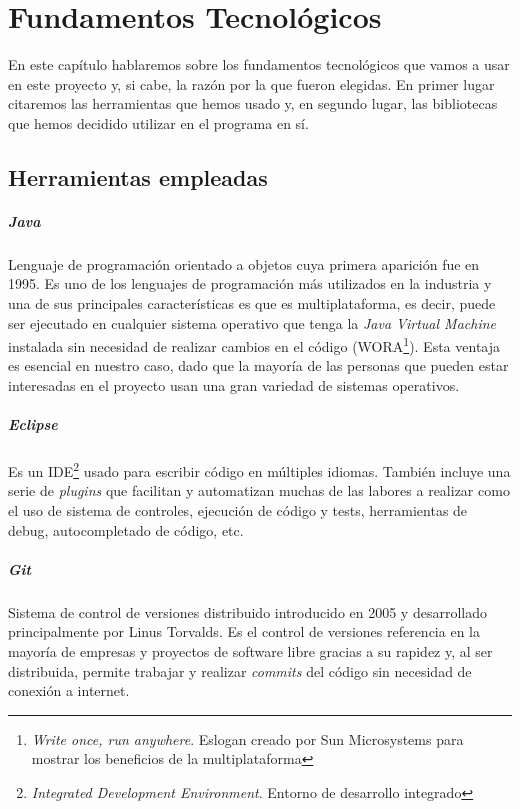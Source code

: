 \chapter{Fundamentos Tecnológicos}

En este capítulo hablaremos sobre los fundamentos tecnológicos que vamos a usar en este proyecto y, si cabe, la razón por la que fueron elegidas. En primer lugar citaremos las herramientas que hemos usado y, en segundo lugar, las bibliotecas que hemos decidido utilizar en el programa en sí.

\section{Herramientas empleadas}

\paragraph{Java} Lenguaje de programación orientado a objetos cuya primera aparición fue en 1995. Es uno de los lenguajes de programación más utilizados en la industria y una de sus principales características es que es multiplataforma, es decir, puede ser ejecutado en cualquier sistema operativo que tenga la \textit{Java Virtual Machine} instalada sin necesidad de realizar cambios en el código (WORA\footnote{\textit{Write once, run anywhere}. Eslogan creado por Sun Microsystems para mostrar los beneficios de la multiplataforma}). Esta ventaja es esencial en nuestro caso, dado que la mayoría de las personas que pueden estar interesadas en el proyecto usan una gran variedad de sistemas operativos.

 \paragraph{Eclipse} Es un IDE\footnote{\textit{Integrated Development Environment}. Entorno de desarrollo integrado} usado para escribir código en múltiples idiomas. También incluye una serie de \textit{plugins} que facilitan y automatizan muchas de las labores a realizar como el uso de sistema de controles, ejecución de código y tests, herramientas de debug, autocompletado de código, etc.

 \paragraph{Git} Sistema de control de versiones distribuido introducido en 2005 y desarrollado principalmente por Linus Torvalds. Es el control de versiones referencia en la mayoría de empresas y proyectos de software libre gracias a su rapidez y, al ser distribuida, permite trabajar y realizar \textit{commits} del código sin necesidad de conexión a internet.


